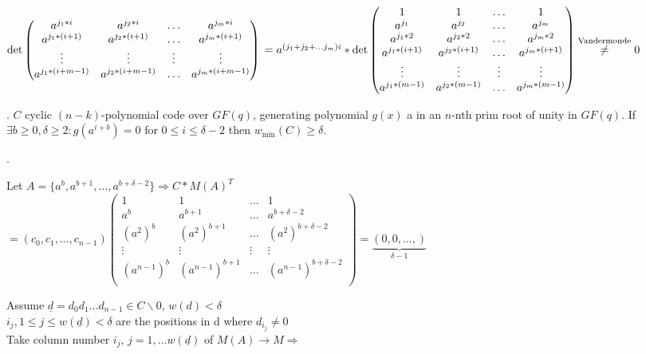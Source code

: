 $\det \begin{pmatrix}
  a^{j_1*i} & a^{j_2*i} & \ldots & a^{j_m*i} \\
  a^{j_1*(i+1)} & a^{j_2*(i+1)} & \ldots & a^{j_m*(i+1)} \\
  \vdots  & \vdots & \vdots & \vdots \\
  a^{j_1*(i+m-1)} & a^{j_2*(i+m-1)} & \ldots & a^{j_m*(i+m-1)} \\
\end{pmatrix}\\
= a^{(j_1+ j_2+ \ldots j_m) i}* \det \begin{pmatrix}
  1 & 1& \ldots & 1\\
  a^{j_1} & a^{j_2} & \ldots & a^{j_m} \\
  a^{j_1*2} & a^{j_2*2} & \ldots & a^{j_m*2} \\
  a^{j_1*(i+1)} & a^{j_2*(i+1)} & \ldots & a^{j_m*(i+1)} \\
  \vdots  & \vdots & \vdots & \vdots \\
  a^{j_1*(m-1)} & a^{j_2*(m-1)} & \ldots & a^{j_m*(m-1)} \\
\end{pmatrix}
\stackrel{\text{Vandermonde}}{\neq} 0$

\Theorem.
$C$ cyclic $(n-k)$-polynomial code over $GF(q)$, generating polynomial $g(x)$ a in an $n$-nth prim root of unity in $GF(q)$. If $\exists b \geq 0, \delta \geq 2: g(a^{i+b}) = 0$ for $0 \leq i \leq \delta -2$ then $w_{\min}(C) \geq \delta$.

\Proof.

Let $A = \{a^b , a^{b+1}, \ldots, a^{b+\delta-2}\} \Rightarrow C * M(A)^T$\\
$= (c_0, c_1, \ldots, c_{n-1}) \begin{pmatrix}
  1 & 1& \ldots & 1\\
  a^{b} & a^{b+1} & \ldots & a^{b+\delta-2} \\
  (a^{2})^{b} & (a^{2})^{b+1} & \ldots & (a^{2})^{b+\delta-2} \\
  \vdots  & \vdots & \vdots & \vdots \\
  (a^{n-1})^{b} & (a^{n-1})^{b+1} & \ldots & (a^{n-1})^{b+\delta-2} \\
\end{pmatrix} = \underbrace{(0,0,\ldots, )}_{\delta-1}$

Assume $\underline{d} = d_0 d_1 \ldots d_{n-1} \in C \backslash{0}$, $w(d) < \delta$\\
$i_j, 1 \leq j \leq w(\underline{d}) < \delta$ are the positions in d where $d_{i_j} \neq 0$ \\
Take column number $i_j$, $j= 1, \ldots w(\underline{d})$ of $M(A) \to M \Rightarrow$

























